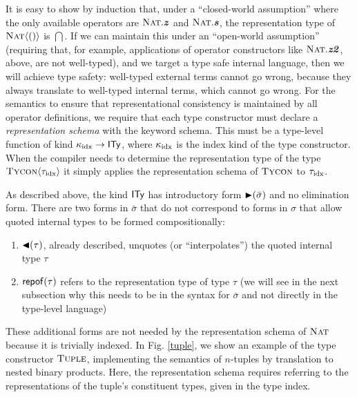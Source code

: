 It is easy to show by induction that, under a ``closed-world assumption'' where the only available operators are $\textsc{Nat}.\textbf{\textit{z}}$ and $\textsc{Nat}.\textbf{\textit{s}}$, the representation type of $\textsc{Nat}\langle()\rangle$ is $\dint$. If we can maintain this under an ``open-world assumption'' (requiring that, for example, applications of operator constructors like $\textsc{Nat}.\textbf{\textit{z2}}$, above, are not well-typed), and we target a type safe internal language, then we will achieve type safety: well-typed external terms cannot go wrong, because they always translate to well-typed internal terms, which cannot go wrong. For the semantics to ensure that representational consistency is maintained by all operator definitions, we require that each type constructor must declare a \emph{representation schema} with the keyword \textsf{schema}. This must be a type-level function of kind $\kappa_{\text{idx}}\rightarrow{\textsf{ITy}}$, where $\kappa_{\text{idx}}$ is the index kind of the type constructor. When the compiler needs to determine the representation type of the type $\textsc{Tycon}\langle{\tau_{\text{idx}}}\rangle$ it simply applies the representation schema of $\textsc{Tycon}$ to ${{\tau_{\text{idx}}}}$.

As described above, the kind $\textsf{ITy}$ has introductory form ${\blacktriangleright}(\bar \sigma)$ and no elimination form. There are two forms in $\bar \sigma$ that do not correspond to forms in $\sigma$ that allow quoted internal types to be formed compositionally:
\begin{enumerate}
\item ${\blacktriangleleft}(\tau)$, already described, unquotes (or ``interpolates'') the quoted internal type $\tau$
\item ${\sf repof}(\tau)$ refers to the representation type of type $\tau$ (we will see in the next subsection why this needs to be in the syntax for $\bar \sigma$ and not directly in the type-level language)
\end{enumerate}

These additional forms are not needed by the representation schema of $\textsc{Nat}$  because it is trivially indexed. In Fig. \ref{tuple}, we show an example of the type constructor $\textsc{Tuple}$, implementing the semantics of $n$-tuples by translation to nested binary products. Here, the representation schema requires referring to the representations of the tuple's constituent types, given in the type index.


